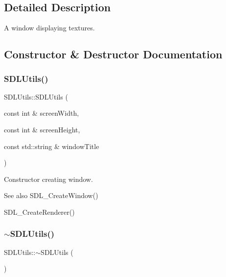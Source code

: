 \subsection{Detailed Description}
A window displaying textures. 

\subsection{Constructor \& Destructor Documentation}
\mbox{\label{class_s_d_l_utils_a53e5b8a0018c3d96af3ad413b2272f3d}} 
\subsubsection{\texorpdfstring{S\+D\+L\+Utils()}{SDLUtils()}}
{\footnotesize\ttfamily S\+D\+L\+Utils\+::\+S\+D\+L\+Utils (\begin{DoxyParamCaption}\item[{const int \&}]{screen\+Width,  }\item[{const int \&}]{screen\+Height,  }\item[{const std\+::string \&}]{window\+Title }\end{DoxyParamCaption})}



Constructor creating window. 

\begin{DoxySeeAlso}{See also}
S\+D\+L\+\_\+\+Create\+Window() 

S\+D\+L\+\_\+\+Create\+Renderer() 
\end{DoxySeeAlso}
\mbox{\label{class_s_d_l_utils_a4530f05f7fdf2495a63ff1e9fc553680}} 
\subsubsection{\texorpdfstring{$\sim$\+S\+D\+L\+Utils()}{~SDLUtils()}}
{\footnotesize\ttfamily S\+D\+L\+Utils\+::$\sim$\+S\+D\+L\+Utils (\begin{DoxyParamCaption}{ }\end{DoxyParamCaption})\hspace{0.3cm}{\ttfamily [virtual]}}



